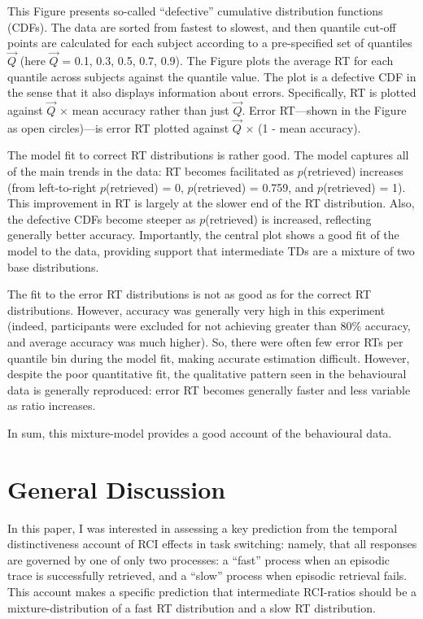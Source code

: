 \documentclass[a4paper, jou, natbib]{apa6}
\begin{document}
This Figure presents so-called ``defective'' cumulative distribution functions (CDFs). The data are sorted from fastest to slowest, and then quantile cut-off points are calculated for each subject according to a pre-specified set of quantiles $\vec{Q}$ (here $\vec{Q}$ = 0.1, 0.3, 0.5, 0.7, 0.9). The Figure plots the average RT for each quantile across subjects against the quantile value. The plot is a defective CDF in the sense that it also displays information about errors. Specifically, RT is plotted against $\vec{Q}$ $\times$ mean accuracy rather than just $\vec{Q}$. Error RT---shown in the Figure as open circles)---is error RT plotted against $\vec{Q}$ $\times$ (1 - mean accuracy).

The model fit to correct RT distributions is rather good. The model captures all of the main trends in the data: RT becomes facilitated as $p$(retrieved) increases (from left-to-right $p$(retrieved) = 0, $p$(retrieved) = 0.759, and $p$(retrieved) = 1). This improvement in RT is largely at the slower end of the RT distribution. Also, the defective CDFs become steeper as $p$(retrieved) is increased, reflecting generally better accuracy. Importantly, the central plot shows a good fit of the model to the data, providing support that intermediate TDs are a mixture of two base distributions. 

The fit to the error RT distributions is not as good as for the correct RT distributions. However, accuracy was generally very high in this experiment (indeed, participants were excluded for not achieving greater than 80\% accuracy, and average accuracy was much higher). So, there were often few error RTs per quantile bin during the model fit, making accurate estimation difficult. However, despite the poor quantitative fit, the qualitative pattern seen in the behavioural data is generally reproduced: error RT becomes generally faster and less variable as ratio increases.

In sum, this mixture-model provides a good account of the behavioural data.


\section{General Discussion}

In this paper, I was interested in assessing a key prediction from the temporal distinctiveness account of RCI effects in task switching: namely, that all responses are governed by one of only two processes: a ``fast'' process when an episodic trace is successfully retrieved, and a ``slow'' process when episodic retrieval fails. This account makes a specific prediction that intermediate RCI-ratios should be a mixture-distribution of a fast RT distribution and a slow RT distribution. 
\end{document}
